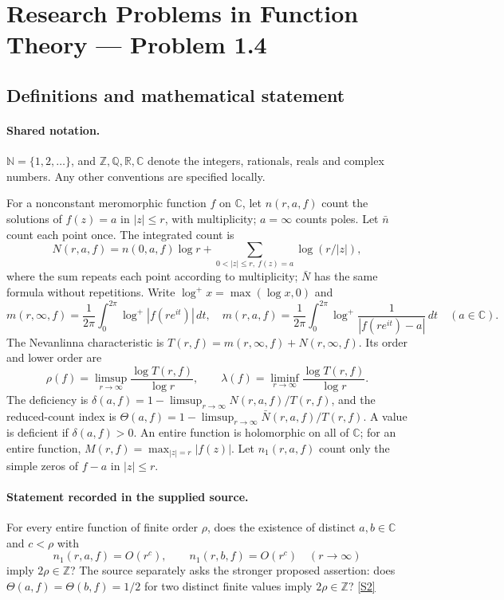 \documentclass[11pt]{article}
\newcommand{\sref}[2]{\hyperlink{source:#1:#2}{[S#2]}}
\begin{document}
\section{Research Problems in Function Theory — Problem 1.4}\label{statement}

\subsection{Definitions and mathematical statement}

\paragraph{Shared notation.}$\mathbb N=\{1,2,\ldots\}$, and $\mathbb Z,\mathbb Q,\mathbb R,\mathbb C$ denote the integers, rationals, reals and complex numbers. Any other conventions are specified locally.


For a nonconstant meromorphic function $f$ on $\mathbb C$, let $n(r,a,f)$ count the solutions of $f(z)=a$ in $|z|\le r$, with multiplicity; $a=\infty$ counts poles. Let $\bar n$ count each point once. The integrated count is
\[
 N(r,a,f)=n(0,a,f)\log r+\sum_{0<|z|\le r,\ f(z)=a}\log(r/|z|),
\]
where the sum repeats each point according to multiplicity; $\bar N$ has the same formula without repetitions. Write $\log^+x=\max(\log x,0)$ and
\[
 m(r,\infty,f)=\frac1{2\pi}\int_0^{2\pi}\log^+|f(re^{it})|\,dt,\quad
 m(r,a,f)=\frac1{2\pi}\int_0^{2\pi}\log^+\frac1{|f(re^{it})-a|}\,dt\quad(a\in\mathbb C).
\]
The Nevanlinna characteristic is $T(r,f)=m(r,\infty,f)+N(r,\infty,f)$. Its order and lower order are
\[
 \rho(f)=\limsup_{r\to\infty}\frac{\log T(r,f)}{\log r},\qquad
 \lambda(f)=\liminf_{r\to\infty}\frac{\log T(r,f)}{\log r}.
\]
The deficiency is $\delta(a,f)=1-\limsup_{r\to\infty}N(r,a,f)/T(r,f)$, and the reduced-count index is $\Theta(a,f)=1-\limsup_{r\to\infty}\bar N(r,a,f)/T(r,f)$. A value is deficient if $\delta(a,f)>0$. An entire function is holomorphic on all of $\mathbb C$; for an entire function, $M(r,f)=\max_{|z|=r}|f(z)|$. Let $n_1(r,a,f)$ count only the simple zeros of $f-a$ in $|z|\le r$.
\paragraph{Statement recorded in the supplied source.}
For every entire function of finite order $\rho$, does the existence of distinct $a,b\in\mathbb C$ and $c<\rho$ with
\[
 n_1(r,a,f)=O(r^c),\qquad n_1(r,b,f)=O(r^c)\quad(r\to\infty)
\]
imply $2\rho\in\mathbb Z$? The source separately asks the stronger proposed assertion: does $\Theta(a,f)=\Theta(b,f)=1/2$ for two distinct finite values imply $2\rho\in\mathbb Z$? \sref{statement}{2}
\end{document}
